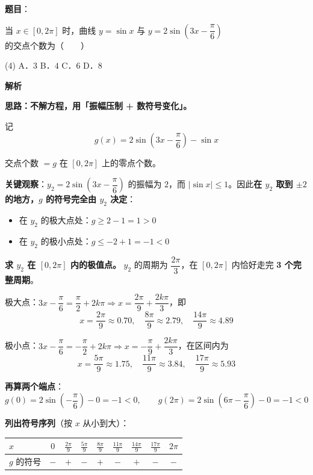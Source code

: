 \begin{answer}

\textbf{题目}：

当 $x\in[0,2\pi]$ 时，曲线 $y=\sin x$ 与 $y=2\sin\left(3x-\dfrac{\pi}{6}\right)$ 的交点个数为\mbox{（　　）}

\begin{gkopts}(4)
\task A．$3$
\task B．$4$
\task C．$6$
\task D．$8$
\end{gkopts}

\textbf{解析}

\textbf{思路：不解方程，用「振幅压制 + 数符号变化」。}

记
\nopagebreak[4]
\[g(x)=2\sin\left(3x-\frac\pi6\right)-\sin x\]

交点个数 $=g$ 在 $[0,2\pi]$ 上的零点个数。

\textbf{关键观察}：$y_2=2\sin\left(3x-\dfrac\pi6\right)$ 的振幅为 $2$，而 $|\sin x|\le1$。因此\textbf{在 $y_2$ 取到 $\pm2$ 的地方，$g$ 的符号完全由 $y_2$ 决定}：

\begin{itemize}
\item 在 $y_2$ 的极大点处：$g\ge2-1=1>0$
\item 在 $y_2$ 的极小点处：$g\le-2+1=-1<0$
\end{itemize}

\textbf{求 $y_2$ 在 $[0,2\pi]$ 内的极值点。} $y_2$ 的周期为 $\dfrac{2\pi}3$，在 $[0,2\pi]$ 内恰好走完 \textbf{3 个完整周期}。

极大点：$3x-\dfrac\pi6=\dfrac\pi2+2k\pi\Rightarrow x=\dfrac{2\pi}9+\dfrac{2k\pi}3$，即
\nopagebreak[4]
\[x=\frac{2\pi}9\approx0.70,\quad \frac{8\pi}9\approx2.79,\quad \frac{14\pi}9\approx4.89\]

极小点：$3x-\dfrac\pi6=-\dfrac\pi2+2k\pi\Rightarrow x=-\dfrac\pi9+\dfrac{2k\pi}3$，在区间内为
\nopagebreak[4]
\[x=\frac{5\pi}9\approx1.75,\quad \frac{11\pi}9\approx3.84,\quad \frac{17\pi}9\approx5.93\]

\textbf{再算两个端点}：
\nopagebreak[4]
\[g(0)=2\sin\left(-\frac\pi6\right)-0=-1<0,\qquad g(2\pi)=2\sin\left(6\pi-\frac\pi6\right)-0=-1<0\]

\textbf{列出符号序列}（按 $x$ 从小到大）：

\begin{center}
\begingroup\setlength{\tabcolsep}{4pt}
\begin{tabular}{lcccccccc}
\toprule
$x$ & $0$ & $\frac{2\pi}9$ & $\frac{5\pi}9$ & $\frac{8\pi}9$ & $\frac{11\pi}9$ & $\frac{14\pi}9$ & $\frac{17\pi}9$ & $2\pi$ \\
\midrule
$g$ 的符号 & $-$ & $+$ & $-$ & $+$ & $-$ & $+$ & $-$ & $-$ \\
\bottomrule
\end{tabular}
\endgroup
\end{center}


\end{answer}
